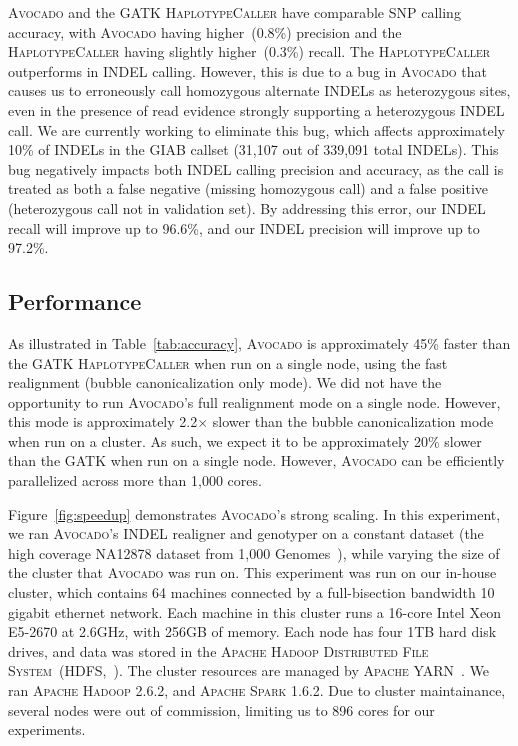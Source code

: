 \documentclass{bioinfo}
\begin{document}
\textsc{Avocado} and the \textsc{GATK HaplotypeCaller} have comparable SNP
calling accuracy, with \textsc{Avocado} having higher~(0.8\%) precision
and the \textsc{HaplotypeCaller} having slightly higher~(0.3\%) recall.
The \textsc{HaplotypeCaller} outperforms in INDEL calling. However, this
is due to a bug in \textsc{Avocado} that causes us to erroneously call
homozygous alternate INDELs as heterozygous sites, even in the presence
of read evidence strongly supporting a heterozygous INDEL call. We are
currently working to eliminate this bug, which affects approximately
10\% of INDELs in the GIAB callset (31,107 out of 339,091 total INDELs).
This bug negatively impacts both INDEL calling precision and accuracy, as
the call is treated as both a false negative (missing homozygous call) and a
false positive (heterozygous call not in validation set). By addressing this
error, our INDEL recall will improve up to 96.6\%, and our INDEL precision
will improve up to 97.2\%.

\subsection{Performance}
\label{sec:performance}

As illustrated in Table~\ref{tab:accuracy}, \textsc{Avocado} is approximately
45\% faster than the \textsc{GATK HaplotypeCaller} when run on a single node,
using the fast realignment (bubble canonicalization only mode). We did not
have the opportunity to run \textsc{Avocado}'s full realignment mode on a
single node. However, this mode is approximately 2.2$\times$ slower than
the bubble canonicalization mode when run on a cluster. As such, we expect
it to be approximately 20\% slower than the \textsc{GATK} when run on a single
node. However, \textsc{Avocado} can be efficiently parallelized across more
than 1,000 cores.

Figure~\ref{fig:speedup} demonstrates \textsc{Avocado}'s strong scaling. In
this experiment, we ran \textsc{Avocado}'s INDEL realigner and genotyper on a
constant dataset (the high coverage NA12878 dataset from 1,000
Genomes~\citep{1kg}), while varying the size of the cluster that \textsc{Avocado}
was run on. This experiment was run on our in-house cluster, which contains
64 machines connected by a full-bisection bandwidth 10 gigabit ethernet
network. Each machine in this cluster runs a 16-core Intel Xeon E5-2670 at
2.6GHz, with 256GB of memory. Each node has four 1TB hard disk
drives, and data was stored in the \textsc{Apache Hadoop Distributed File
System}~(HDFS,~\citep{shvachko10}). The cluster resources are managed by \textsc{Apache
YARN}~\citep{vavilapalli13}. We ran \textsc{Apache Hadoop} 2.6.2, and \textsc{Apache
Spark} 1.6.2. Due to cluster maintainance, several nodes were out of commission,
limiting us to 896 cores for our experiments.
\end{document}
